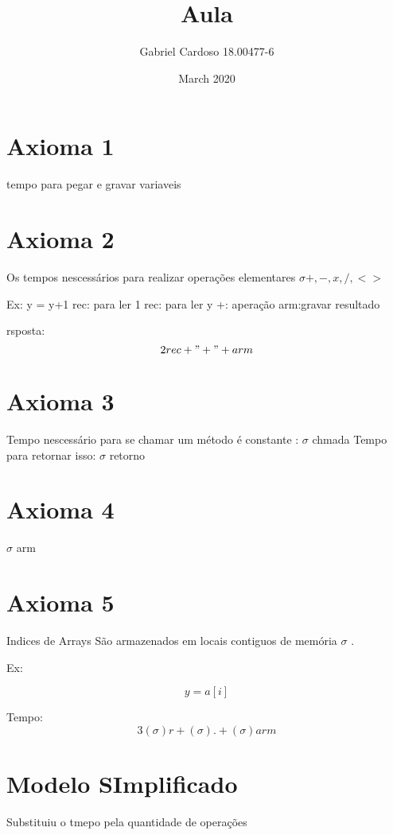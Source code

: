 \documentclass{article}
\title{Aula}
\author{Gabriel Cardoso 18.00477-6}
\date{March 2020}
\begin{document}
\maketitle

\section{Axioma 1}
tempo para pegar e gravar variaveis

\section{Axioma 2}
Os tempos nescessários para realizar operações elementares
$\sigma +,-,x,/,<>$


Ex:
y = y+1
rec: para ler 1
rec: para ler y
+: aperação
arm:gravar resultado

rsposta: \[2rec + "+" + arm \]

\section{Axioma 3}
Tempo nescessário para se chamar um método é constante : $\sigma$ chmada
Tempo para retornar isso: $\sigma$ retorno

\section{Axioma 4}
$\sigma$  arm

\section{Axioma 5}
Indices de Arrays
São armazenados em locais contiguos de memória
$\sigma$ .

Ex: 

\[y = a[i] \]

Tempo: \[ 3(\sigma)r+(\sigma).+(\sigma)arm \]

\section{Modelo SImplificado}
Substituiu o tmepo pela quantidade de operações
\end{document}
